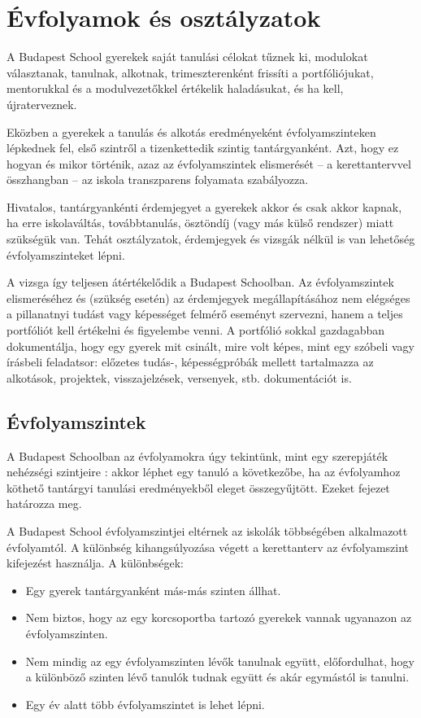 \section{Évfolyamok és osztályzatok}
A Budapest School gyerekek saját tanulási célokat tűznek ki, modulokat
választanak, tanulnak, alkotnak, trimeszterenként frissíti a portfóliójukat,
mentorukkal és a modulvezetőkkel értékelik haladásukat, és ha kell,
újraterveznek.

Eközben a gyerekek a tanulás és alkotás eredményeként évfolyamszinteken
lépkednek fel,
első szintről a tizenkettedik szintig tantárgyanként.
Azt, hogy ez hogyan és mikor történik, azaz az évfolyamszintek elismerését -- a
kerettantervvel összhangban -- az iskola transzparens folyamata
szabályozza.

Hivatalos, tantárgyankénti érdemjegyet a gyerekek akkor és csak akkor kapnak,
ha erre iskolaváltás, továbbtanulás, ösztöndíj	    (vagy más külső rendszer)
miatt szükségük van.
Tehát osztályzatok, érdemjegyek és vizsgák nélkül is van lehetőség
évfolyamszinteket lépni.

A vizsga így teljesen átértékelődik a Budapest Schoolban.
Az évfolyamszintek elismeréséhez és (szükség esetén) az érdemjegyek
megállapításához
nem elégséges a pillanatnyi tudást vagy képességet felmérő eseményt szervezni,
hanem
a teljes portfóliót kell értékelni és figyelembe venni.
A portfólió sokkal gazdagabban dokumentálja, hogy egy gyerek mit csinált, mire
volt képes, mint egy szóbeli vagy írásbeli feladatsor: előzetes tudás-,
képességpróbák
mellett tartalmazza az alkotások, projektek, visszajelzések, versenyek, stb.
dokumentációt is.

\subsection{Évfolyamszintek}
\label{sec:evfolyamok}

A Budapest Schoolban az évfolyamokra úgy tekintünk, mint egy szerepjáték
nehézségi
szintjeire \citep{wiki:game_levels}: akkor léphet egy tanuló a következőbe, ha
az
évfolyamhoz köthető tantárgyi tanulási eredményekből eleget összegyűjtött.
Ezeket  fejezet határozza meg.

A Budapest School évfolyamszintjei eltérnek az iskolák többségében alkalmazott
évfolyamtól. A különbség kihangsúlyozása végett a kerettanterv az évfolyamszint
kifejezést használja. A különbségek:

\begin{itemize}
      \item Egy gyerek tantárgyanként más-más szinten állhat.
      \item Nem biztos, hogy az egy korcsoportba tartozó gyerekek vannak
            ugyanazon az évfolyamszinten.

      \item Nem mindig az egy évfolyamszinten lévők tanulnak együtt,
            előfordulhat, hogy a különböző szinten lévő tanulók tudnak együtt
            és akár
            egymástól is tanulni.

      \item Egy év alatt több évfolyamszintet is lehet lépni.
\end{itemize}

